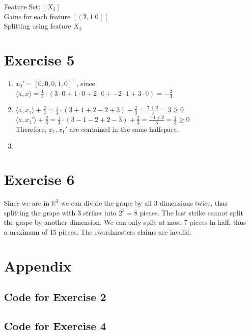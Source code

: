 \documentclass[12pt]{article}
\begin{document}
Feature Set: $[X_3]$ \\
Gains for each feature $[(2, 1.0)]$ \\
Splitting using feature $X_3$ \\

\section*{Exercise 5}
\begin{enumerate}[label=(\alph*)]
	\item	$x_0' = [0, 0, 0, 1, 0]^\top$, since $\langle a,x \rangle = \frac{1}{3} \cdot (3 \cdot 0 + 1 \cdot 0 + 2 \cdot 0 + -2 \cdot 1 + 3 \cdot 0) = -\frac{2}{3}$
	\item	$\langle a,x_1 \rangle + \frac{2}{3} = \frac{1}{3} \cdot (3+1+2-2+3) + \frac{2}{3} = \frac{7+2}{3} = 3 \geq 0$ \\
			$\langle a,x_1' \rangle + \frac{2}{3} = \frac{1}{3} \cdot (3-1-2+2-3) + \frac{2}{3} = \frac{-1+2}{3} = \frac{1}{3} \geq 0$ \\
			Therefore, $x_1,x_1'$ are contained in the same halfspace.
	\item
\end{enumerate}

\section*{Exercise 6}
Since we are in $\mathbb{R}^3$ we can divide the grape by all 3 dimensions twice, thus splitting the grape with 3 strikes into $2^3=8$ pieces. The last strike cannot split the grape by another dimension. We can only split at most 7 pieces in half, thus a maximum of 15 pieces. The swordmasters claims are invalid.

\section*{Appendix}\label{appendix}
\subsection*{Code for Exercise 2}


\subsection*{Code for Exercise 4}

\end{document}
